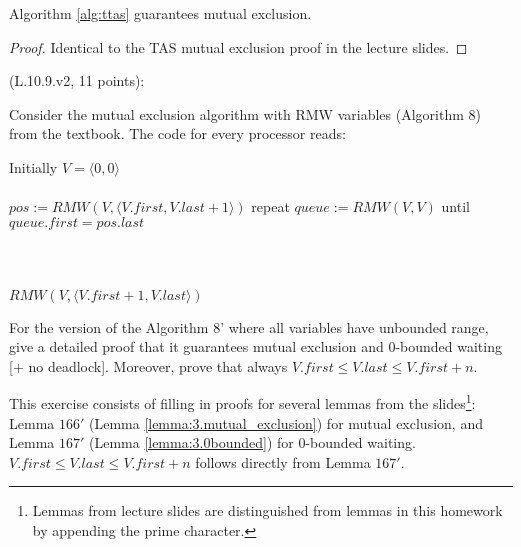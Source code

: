 \begin{theorem}
Algorithm \ref{alg:ttas} guarantees mutual exclusion.
\end{theorem}

\begin{proof}
Identical to the TAS mutual exclusion proof in the lecture slides.
\end{proof}


\newcommand{\last}[1]{#1.\mathit{last}}
\newcommand{\first}[1]{#1.\mathit{first}}
\newcommand{\VV}[1]{\langle #1 \rangle}
\newcommand{\pos}{\mathit{pos}}
\newcommand{\queue}{\mathit{queue}}
\newcommand{\RMW}{\mathit{RMW}}

\begin{Exc}{(L.10.9.v2, 11 points):}

Consider the mutual exclusion algorithm with RMW variables
(Algorithm 8) from the textbook. The code for every processor
reads:

\begin{code}%
\vspace*{-1cm}%
Initially $V=\VV{0,0}$\\
\\
\NL
\> $\pos := \RMW(V,\VV{\first{V},\last{V}+1})$\NL
\> repeat\NL
\>\> $\queue := \RMW(V,V)$\NL
\> until $\first{\queue} = \last{\pos}$\\
\\
\\
\\
\NL
\> $\RMW(V,\VV{\first{V}+1,\last{V}})$
\end{code}

For the version of the Algorithm 8' where all variables have unbounded
range, give a detailed proof that it guarantees mutual exclusion and
0-bounded waiting [+ no deadlock]. Moreover, prove that always
$\first{V} \leq \last{V} \leq \first{V}+n$.
\end{Exc}

This exercise consists of filling in proofs for several lemmas from the 
slides\footnote{Lemmas from lecture slides are distinguished from lemmas in this
homework by appending the prime character.}:
Lemma $166'$ (Lemma \ref{lemma:3.mutual_exclusion}) for mutual exclusion,
and Lemma $167'$ (Lemma \ref{lemma:3.0bounded}) for 0-bounded waiting. 
$\first{V} \leq \last{V} \leq \first{V}+n$ follows directly from Lemma $167'$.

